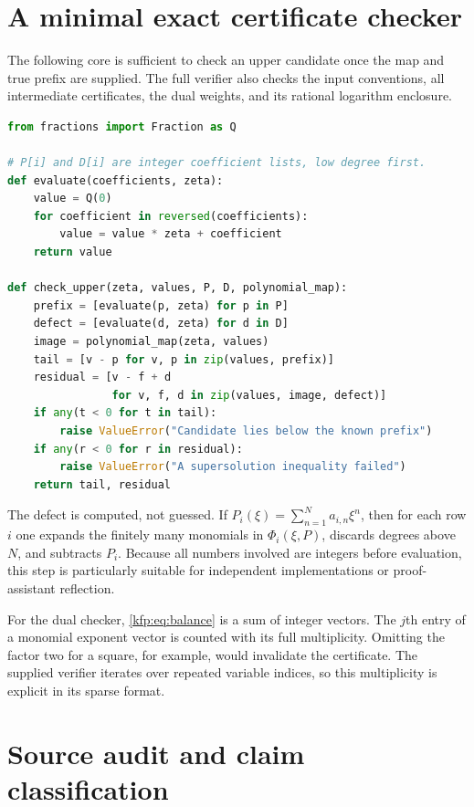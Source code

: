 \documentclass[11pt,a4paper]{article}
\theoremstyle{definition}
\theoremstyle{remark}
\begin{document}
\section{A minimal exact certificate checker}
\label{kfp:app:checker}
The following core is sufficient to check an upper candidate once the map
and true prefix are supplied. The full verifier also checks the input
conventions, all intermediate certificates, the dual weights, and its
rational logarithm enclosure.
\begin{lstlisting}[language=Python]
from fractions import Fraction as Q

# P[i] and D[i] are integer coefficient lists, low degree first.
def evaluate(coefficients, zeta):
    value = Q(0)
    for coefficient in reversed(coefficients):
        value = value * zeta + coefficient
    return value

def check_upper(zeta, values, P, D, polynomial_map):
    prefix = [evaluate(p, zeta) for p in P]
    defect = [evaluate(d, zeta) for d in D]
    image = polynomial_map(zeta, values)
    tail = [v - p for v, p in zip(values, prefix)]
    residual = [v - f + d
                for v, f, d in zip(values, image, defect)]
    if any(t < 0 for t in tail):
        raise ValueError("Candidate lies below the known prefix")
    if any(r < 0 for r in residual):
        raise ValueError("A supersolution inequality failed")
    return tail, residual
\end{lstlisting}

The defect is computed, not guessed. If $P_i(\xi)=\sum_{n=1}^Na_{i,n}\xi^n$,
then for each row $i$ one expands the finitely many monomials in
$\Phi_i(\xi,P)$, discards degrees above $N$, and subtracts $P_i$.
Because all numbers involved are integers before evaluation, this step is
particularly suitable for independent implementations or proof-assistant
reflection.

For the dual checker, \eqref{kfp:eq:balance} is a sum of integer vectors.
The $j$th entry of a monomial exponent vector is counted with its full
multiplicity. Omitting the factor two for a square, for example, would
invalidate the certificate. The supplied verifier iterates over repeated
variable indices, so this multiplicity is explicit in its sparse format.

\section{Source audit and claim classification}
\label{kfp:app:audit}
\end{document}
